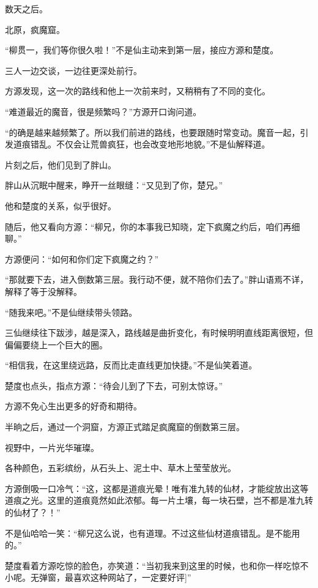 
\begin{this_body}

数天之后。

北原，疯魔窟。

“柳贯一，我们等你很久啦！”不是仙主动来到第一层，接应方源和楚度。

三人一边交谈，一边往更深处前行。

方源发现，这一次的路线和他上一次前来时，又稍稍有了不同的变化。

“难道最近的魔音，很是频繁吗？”方源开口询问道。

“的确是越来越频繁了。所以我们前进的路线，也要跟随时常变动。魔音一起，引发道痕错乱。不仅会让荒兽疯狂，也会改变地形地貌。”不是仙解释道。

片刻之后，他们见到了胖山。

胖山从沉眠中醒来，睁开一丝眼缝：“又见到了你，楚兄。”

他和楚度的关系，似乎很好。

随后，他又看向方源：“柳兄，你的本事我已知晓，定下疯魔之约后，咱们再细聊。”

方源便问：“如何和你们定下疯魔之约？”

“那就要下去，进入倒数第三层。我行动不便，就不陪你们去了。”胖山语焉不详，解释了等于没解释。

“随我来吧。”不是仙继续带头领路。

三仙继续往下跋涉，越是深入，路线越是曲折变化，有时候明明直线距离很短，但偏偏要绕上一个巨大的圈。

“相信我，在这里绕远路，反而比走直线更加快捷。”不是仙笑着道。

楚度也点头，指点方源：“待会儿到了下去，可别太惊讶。”

方源不免心生出更多的好奇和期待。

半晌之后，通过一个洞窟，方源正式踏足疯魔窟的倒数第三层。

视野中，一片光华璀璨。

各种颜色，五彩缤纷，从石头上、泥土中、草木上莹莹放光。

方源倒吸一口冷气：“这，这都是道痕光晕！唯有准九转的仙材，才能绽放出这等道痕之光。这里的道痕竟然如此浓郁。每一片土壤，每一块石壁，岂不都是准九转的仙材了？！”

不是仙哈哈一笑：“柳兄这么说，也有道理。不过这些仙材道痕错乱。是不能用的。”

楚度看着方源吃惊的脸色，亦笑道：“当初我来到这里的时候，也和你一样吃惊不小呢。无弹窗，最喜欢这种网站了，一定要好评]”


\end{this_body}
